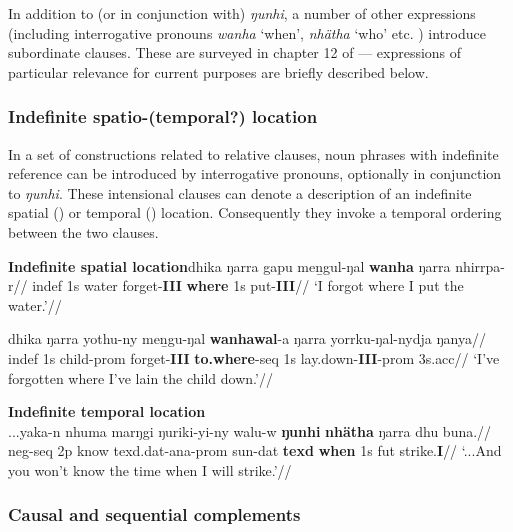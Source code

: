 In addition to (or in conjunction with) \textit{ŋunhi}, a number of other expressions (including interrogative pronouns \textit{wanha} `when', \textit{nhätha} `who' etc. ) introduce subordinate clauses. These are surveyed in chapter 12 of \citet{Wilkinson1991} --- expressions of particular relevance for current purposes are briefly described below.

\subsubsection*{Indefinite spatio-(temporal?) location}

In a set of constructions related to relative clauses, noun phrases with indefinite reference can be introduced by interrogative pronouns, optionally in conjunction to \textit{ŋunhi}. These intensional clauses can denote a description of an indefinite spatial () or temporal () location. Consequently they invoke a temporal ordering between the two clauses.


\pex{}\textbf{Indefinite spatial location}\a\begingl\gla dhika ŋarra gapu meṉgul-ŋal \textbf{wanha} ŋarra nhirrpa-r//
\glb \gls{indef} 1s water forget-\textbf{III} \textbf{where} 1s put-\textbf{III}//
\glft`I forgot where I put the water.'//\endgl

\a\begingl\gla dhika ŋarra yothu-ny meṉgu-ŋal \textbf{wanhawal}-a ŋarra yorrku-ŋal-nydja ŋanya//
\glb \gls{indef} 1s child-\gls{prom} forget-\textbf{III} \textbf{to.where}-\gls{seq} 1s lay.down-\textbf{III}-\gls{prom} 3s.\gls{acc}//
\glft`I've forgotten where I've lain the child down.'//\endgl\xe

\pex{}\textbf{Indefinite temporal location}\\\begingl\gla ...yaka-n nhuma marŋgi ŋuriki-yi-ny walu-w \textbf{ŋunhi} \textbf{nhätha} ŋarra dhu buna.//
\glb \gls{neg}-\gls{seq} 2p know \gls{texd}.\gls{dat}-\gls{ana}-\gls{prom} sun-\gls{dat} \textbf{\gls{texd}} \textbf{when} 1s \gls{fut} strike.\textbf{I}//
\glft`...And you won't know the time when I will strike.'\trailingcitation{[DB Rev 3.3]}//\endgl
\xe
\subsubsection*{Causal and sequential complements}

